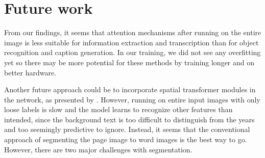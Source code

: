


\section{Future work}

From our findings, it seems that attention mechanisms after running on the entire image is less suitable for information extraction and transcription than for object recognition and caption generation. In our training, we did not see any overfitting yet so there may be more potential for these methods by training longer and on better hardware.

Another future approach could be to incorporate spatial transformer modules in the network, as presented by \textcite{SpatialTransformerNetworks}.
However, running on entire input images with only loose labels is slow and the model learns to recognize other features than intended, since the background text is too difficult to distinguish from the years and too seemingly predictive to ignore.
Instead, it seems that the conventional approach of segmenting the page image to word images is the best way to go. However, there are two major challenges with segmentation.

